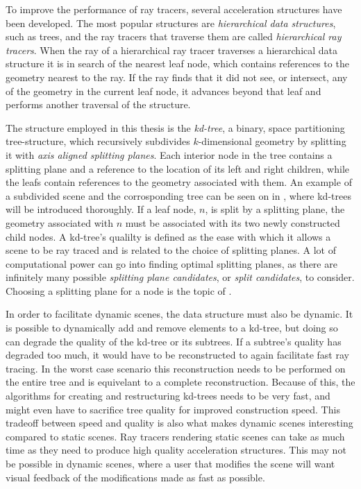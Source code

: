 
To improve the performance of ray tracers, several acceleration structures have
been developed. The most popular structures are \textit{hierarchical data
  structures}, such as trees, and the ray tracers that traverse them are called
\textit{hierarchical ray tracers}. When the ray of a hierarchical ray tracer
traverses a hierarchical data structure it is in search of the nearest leaf
node, which contains references to the geometry nearest to the ray. If the ray
finds that it did not see, or intersect, any of the geometry in the current leaf
node, it advances beyond that leaf and performs another traversal of the
structure.

The structure employed in this thesis is the \textit{kd-tree}, a binary, space
partitioning tree-structure, which recursively subdivides $k$-dimensional
geometry by splitting it with \textit{axis aligned splitting planes}. Each
interior node in the tree contains a splitting plane and a reference to the
location of its left and right children, while the leafs contain references to
the geometry associated with them. An example of a subdivided scene and the
corrosponding tree can be seen on  in
, where kd-trees will be introduced thoroughly. If a
leaf node, $n$, is split by a splitting plane, the geometry associated with $n$
must be associated with its two newly constructed child nodes. A kd-tree's
qualilty is defined as the ease with which it allows a scene to be ray traced
and is related to the choice of splitting planes. A lot of computational power
can go into finding optimal splitting planes, as there are infinitely many
possible \textit{splitting plane candidates}, or \textit{split candidates}, to
consider. 
Choosing a splitting plane for a node is the topic of
.

In order to facilitate dynamic scenes, the data structure must also be
dynamic. It is possible to dynamically add and remove elements to a kd-tree, but
doing so can degrade the quality of the kd-tree or its subtrees. If a subtree's
quality has degraded too much, it would have to be reconstructed to again
facilitate fast ray tracing. In the worst case scenario this reconstruction
needs to be performed on the entire tree and is equivelant to a complete
reconstruction. Because of this, the algorithms for creating and restructuring
kd-trees needs to be very fast, and might even have to sacrifice tree quality
for improved construction speed. This tradeoff between speed and quality is also
what makes dynamic scenes interesting compared to static scenes. Ray tracers
rendering static scenes can take as much time as they need to produce high
quality acceleration structures. This may not be possible in dynamic scenes,
where a user that modifies the scene will want visual feedback of the
modifications made as fast as possible.


